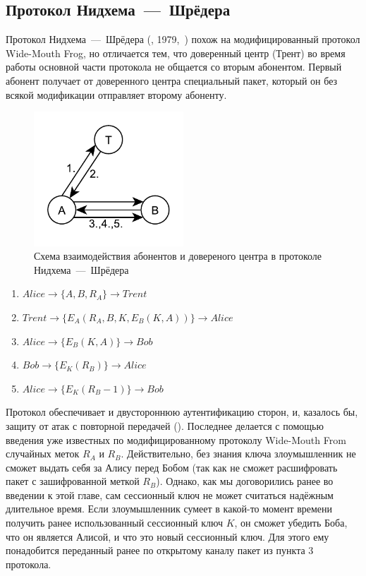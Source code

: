 \subsection{Протокол Нидхема~---~Шрёдера}

Протокол Нидхема~---~Шрёдера (, 1979,~\cite{Needham:Schroeder:1978}) похож на модифицированный протокол Wide-Mouth Frog, но отличается тем, что доверенный центр (Трент) во время работы основной части протокола не общается со вторым абонентом. Первый абонент получает от доверенного центра специальный пакет, который он без всякой модификации отправляет второму абоненту.

\begin{figure}[!htb]
    \centering
    \includegraphics[width=0.5\textwidth]{pic/key_distribution-needham-schroeder}
    \caption{Схема взаимодействия абонентов и довереного центра в протоколе Нидхема~---~Шрёдера\label{fig:key_distribution-needham-schroeder}}
\end{figure}

\begin{enumerate}
	\item $ Alice	\rightarrow \{ A, B, R_A \}						\rightarrow Trent $
	\item $ Trent	\rightarrow \{ E_A \left( R_A, B, K, E_B \left( K, A \right) \right) \}	\rightarrow Alice $
	\item $ Alice	\rightarrow \{ E_B \left( K, A \right) \}				\rightarrow Bob $
	\item $ Bob	\rightarrow \{ E_K \left( R_B \right) \}				\rightarrow Alice $
	\item $ Alice	\rightarrow \{ E_K \left( R_B - 1 \right) \}				\rightarrow Bob $
\end{enumerate}

Протокол обеспечивает и двустороннюю аутентификацию сторон, и, казалось бы, защиту от атак с повторной передачей (). Последнее делается с помощью введения уже известных по модифицированному протоколу Wide-Mouth From случайных меток $R_A$ и $R_B$. Действительно, без знания ключа злоумышленник не сможет выдать себя за Алису перед Бобом (так как не сможет расшифровать пакет с зашифрованной меткой $R_B$). Однако, как мы договорились ранее во введении к этой главе, сам сессионный ключ не может считаться надёжным длительное время. Если злоумышленник сумеет в какой-то момент времени получить ранее использованный сессионный ключ $K$, он сможет убедить Боба, что он является Алисой, и что это новый сессионный ключ. Для этого ему понадобится переданный ранее по открытому каналу пакет из пункта 3 протокола.

